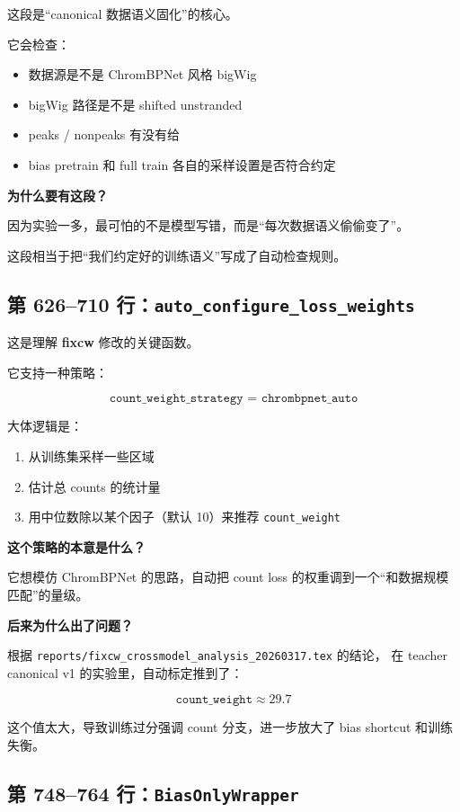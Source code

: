 \documentclass[11pt,a4paper]{ctexart}
\begin{document}
这段是“canonical 数据语义固化”的核心。

它会检查：

\begin{itemize}[leftmargin=2em]
\item 数据源是不是 ChromBPNet 风格 bigWig
\item bigWig 路径是不是 shifted unstranded
\item peaks / nonpeaks 有没有给
\item bias pretrain 和 full train 各自的采样设置是否符合约定
\end{itemize}

\textbf{为什么要有这段？}

因为实验一多，最可怕的不是模型写错，而是“每次数据语义偷偷变了”。

这段相当于把“我们约定好的训练语义”写成了自动检查规则。

\subsection{第 626--710 行：\texttt{auto\_configure\_loss\_weights}}

这是理解 \textbf{fixcw} 修改的关键函数。

它支持一种策略：

\[
\texttt{count\_weight\_strategy = chrombpnet\_auto}
\]

大体逻辑是：

\begin{enumerate}[leftmargin=2em]
\item 从训练集采样一些区域
\item 估计总 counts 的统计量
\item 用中位数除以某个因子（默认 10）来推荐 \texttt{count\_weight}
\end{enumerate}

\textbf{这个策略的本意是什么？}

它想模仿 ChromBPNet 的思路，自动把 count loss 的权重调到一个“和数据规模匹配”的量级。

\textbf{后来为什么出了问题？}

根据 \texttt{reports/fixcw\_crossmodel\_analysis\_20260317.tex} 的结论，
在 teacher canonical v1 的实验里，自动标定推到了：

\[
\texttt{count\_weight} \approx 29.7
\]

这个值太大，导致训练过分强调 count 分支，进一步放大了 bias shortcut 和训练失衡。

\subsection{第 748--764 行：\texttt{BiasOnlyWrapper}}
\end{document}
